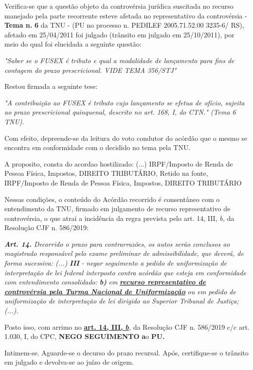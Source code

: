 \documentclass[12pt]{article}
\begin{document}
\justifying
\noindent Verifica-se que a questão objeto da controvérsia jurídica suscitada no recurso manejado pela parte recorrente esteve afetada no representativo da controvérsia - \textbf{Tema n. }\textbf{6} da TNU - (PU no processo n. PEDILEF 2005.71.52.00 3235-6/ RS),  afetado em 25/04/2011 foi julgado (trânsito em julgado em 25/10/2011), por meio do qual foi elucidada a seguinte questão:

\noindent \textit{"Saber se o FUSEX é tributo e qual a modalidade de lançamento para fins de contagem do prazo prescricional. VIDE TEMA 356/STJ"}

\noindent Restou firmada a seguinte tese:

\noindent \textit{"A contribuição ao FUSEX é tributo cujo lançamento se efetua de ofício, sujeita ao prazo prescricional quinquenal, descrito no art. 168, I, do CTN." (Tema 6 TNU).}

\noindent Com efeito, depreende-se da leitura do voto condutor do acórdão que o mesmo se encontra em conformidade com o decidido no  tema pela TNU.

\noindent A proposito, consta do acordao hostilizado: (...) IRPF/Imposto de Renda de Pessoa Física, Impostos, DIREITO TRIBUTÁRIO, Retido na fonte, IRPF/Imposto de Renda de Pessoa Física, Impostos, DIREITO TRIBUTÁRIO

\noindent Nessas condições, o conteúdo do Acórdão recorrido é consentâneo com o entendimento da TNU, firmado em julgamento de recurso representativo de controvérsia, o que atrai a incidência da regra prevista pelo art. 14, III, \textit{b,} da Resolução CJF n. 586/2019:

\noindent \textit{\textbf{Art. 14.}}\textit{ Decorrido o prazo para contrarrazões, os autos serão conclusos ao magistrado responsável pelo exame preliminar de admissibilidade, que deverá, de forma sucessiva: (...) }\textit{\textbf{III }}\textit{- negar seguimento a pedido de uniformização de interpretação de lei federal interposto contra acórdão que esteja em conformidade com entendimento consolidado: }\textit{\textbf{b)}}\textit{ em }\uline{\textit{\textbf{recurso representativo de controvérsia pela Turma Nacional de Uniformização}}}\textit{ ou em pedido de uniformização de interpretação de lei dirigido ao Superior Tribunal de Justiça;(...).}

\noindent Posto isso, com arrimo no \uline{\textbf{art. 14, III, }}\uline{\textit{\textbf{b}}}\textit{,} da Resolução CJF n. 586/2019 c/c art. 1.030, I, do CPC, \textbf{NEGO SEGUIMENTO }\textbf{a}o\textbf{ PU}\textbf{.}

\noindent Intimem-se. Aguarde-se o decurso do prazo recursal. Após, certifique-se o trânsito em julgado e devolva-se ao juízo de origem.
\end{document}
